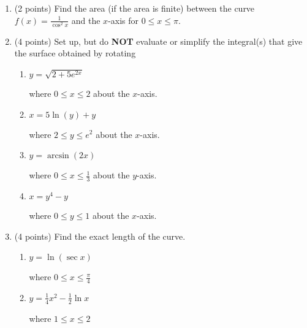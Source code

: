 \documentclass[paper=a4, fontsize=11pt]{scrartcl} %
\numberwithin{equation}{section} %
\numberwithin{figure}{section} %
\numberwithin{table}{section} %
\begin{document}
\begin{enumerate}
\item (2 points) Find the area (if the area is finite) between the curve $f(x)=\frac{1}{\cos^2 x}$ and the $x$-axis for $0 \le x \le \pi$.\\

\newpage


\item (4 points) Set up, but do \textbf{NOT} evaluate or simplify the integral(s) that give the surface obtained by rotating 
\begin{enumerate}
\item \begin{large}$y=\sqrt{2+5e^{2x}}$\end{large} where $0 \le x \le 2$ about the $x$-axis.
\vspace{1.75in}
\item \begin{large}$x=5 \ln(y) + y$\end{large} where $2 \le y \le e^2$ about the $x$-axis.
\vspace{1.75in}
\item \begin{large}$y=\arcsin(2x)$\end{large} where $0 \le x \le \frac{1}{3}$ about the $y$-axis.
\vspace{1.75in}
\item \begin{large}$x=y^4-y$\end{large} where $0 \le y \le 1$ about the $x$-axis.
\end{enumerate}

\newpage
\item (4 points) Find the exact length of the curve.
\begin{enumerate}
\item \begin{large}$y=\ln (\sec x)$\end{large} where $0 \le x \le \frac{\pi}{4}$
\vspace{3.5in}
\item \begin{large}$y=\frac{1}{4}x^2-\frac{1}{2} \ln x$\end{large} where $1 \le x \le 2$
\end{enumerate}

\newpage

\end{enumerate}

\end{document}
